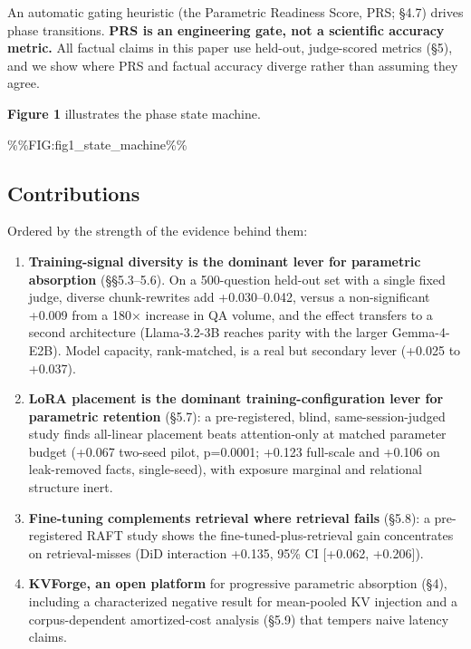 An automatic gating heuristic (the Parametric Readiness Score, PRS; §4.7) drives phase transitions. \textbf{PRS is an engineering gate, not a scientific accuracy metric.} All factual claims in this paper use held-out, judge-scored metrics (§5), and we show where PRS and factual accuracy diverge rather than assuming they agree.

\textbf{Figure 1} illustrates the phase state machine.

\%\%FIG:fig1\_state\_machine\%\%

\hypertarget{contributions}{%
\subsection{Contributions}\label{contributions}}

Ordered by the strength of the evidence behind them:

\begin{enumerate}
\def\labelenumi{\arabic{enumi}.}
\tightlist
\item
  \textbf{Training-signal diversity is the dominant lever for parametric absorption} (§§5.3--5.6). On a 500-question held-out set with a single fixed judge, diverse chunk-rewrites add +0.030--0.042, versus a non-significant +0.009 from a 180× increase in QA volume, and the effect transfers to a second architecture (Llama-3.2-3B reaches parity with the larger Gemma-4-E2B). Model capacity, rank-matched, is a real but secondary lever (+0.025 to +0.037).
\item
  \textbf{LoRA placement is the dominant training-configuration lever for parametric retention} (§5.7): a pre-registered, blind, same-session-judged study finds all-linear placement beats attention-only at matched parameter budget (+0.067 two-seed pilot, p=0.0001; +0.123 full-scale and +0.106 on leak-removed facts, single-seed), with exposure marginal and relational structure inert.
\item
  \textbf{Fine-tuning complements retrieval where retrieval fails} (§5.8): a pre-registered RAFT study shows the fine-tuned-plus-retrieval gain concentrates on retrieval-misses (DiD interaction +0.135, 95\% CI {[}+0.062, +0.206{]}).
\item
  \textbf{KVForge, an open platform} for progressive parametric absorption (§4), including a characterized negative result for mean-pooled KV injection and a corpus-dependent amortized-cost analysis (§5.9) that tempers naive latency claims.
\end{enumerate}

